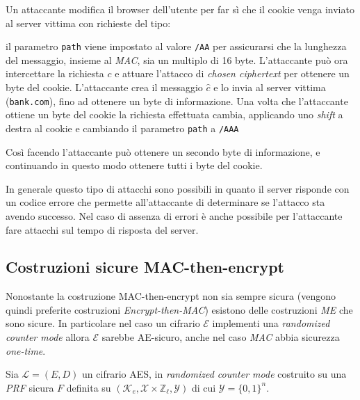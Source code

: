 \vspace{1em}\noindent
Un attaccante modifica il browser dell'utente per far sì che il cookie venga inviato al server vittima con richieste del tipo:
\begin{center}
\end{center}
il parametro \texttt{path} viene impostato al valore \texttt{/AA} per assicurarsi che la lunghezza del messaggio, insieme al \emph{MAC}, sia un multiplo di 16 byte. L'attaccante può ora intercettare la richiesta $c$ e attuare l'attacco di \emph{chosen ciphertext} per ottenere un byte del cookie. L'attaccante crea il messaggio $\hat{c}$ e lo invia al server vittima (\texttt{bank.com}), fino ad ottenere un byte di informazione. Una volta che l'attaccante ottiene un byte del cookie la richiesta effettuata cambia, applicando uno \emph{shift} a destra al cookie e cambiando il parametro \texttt{path} a \texttt{/AAA}
\begin{center}
\end{center}
Così facendo l'attaccante può ottenere un secondo byte di informazione, e continuando in questo modo ottenere tutti i byte del cookie.

\vspace{1em}\noindent
In generale questo tipo di attacchi sono possibili in quanto il server risponde con un codice errore che permette all'attaccante di determinare se l'attacco sta avendo successo. Nel caso di assenza di errori è anche possibile per l'attaccante fare attacchi sul tempo di risposta del server.

\subsection{Costruzioni sicure MAC-then-encrypt}
Nonostante la costruzione MAC-then-encrypt non sia sempre sicura (vengono quindi preferite costruzioni \emph{Encrypt-then-MAC}) esistono delle costruzioni \emph{ME} che sono sicure. In particolare nel caso un cifrario $\mathcal{E}$ implementi una \emph{randomized counter mode} allora $\mathcal{E}$ sarebbe AE-sicuro, anche nel caso \emph{MAC} abbia sicurezza \emph{one-time}.

\vspace{1em}\noindent
Sia $\mathcal{L} = (E,D)$ un cifrario AES, in \emph{randomized counter mode} costruito su una \emph{PRF} sicura $F$ definita su $(\mathcal{K}_e,\mathcal{X} \times \mathbb{Z}_{\ell}, \mathcal{Y})$ di cui $\mathcal{Y} = \{0,1\}^{n}$.

